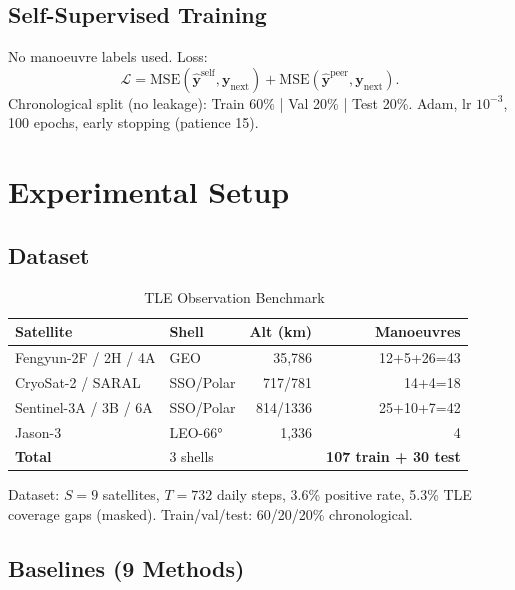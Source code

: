 \documentclass[journal]{IEEEtran}
\begin{document}
\subsection{Self-Supervised Training}
No manoeuvre labels used. Loss:
\begin{equation}
  \mathcal{L} = \text{MSE}(\hat{\mathbf{y}}^\text{self},\mathbf{y}_\text{next})
              + \text{MSE}(\hat{\mathbf{y}}^\text{peer},\mathbf{y}_\text{next}).
\end{equation}
Chronological split (no leakage): Train 60\% | Val 20\% | Test 20\%.
Adam, lr $10^{-3}$, 100 epochs, early stopping (patience 15).

\section{Experimental Setup}

\subsection{Dataset}

\begin{table}[h]
\centering\caption{TLE Observation Benchmark~\cite{shorten2023}}
\label{tab:dataset}
\setlength\tabcolsep{4pt}
\begin{tabular}{@{}llrr@{}}
\toprule
Satellite & Shell & Alt (km) & Manoeuvres \\
\midrule
Fengyun-2F / 2H / 4A & GEO       & 35,786 & 12+5+26=43 \\
CryoSat-2 / SARAL    & SSO/Polar & 717/781 & 14+4=18    \\
Sentinel-3A / 3B / 6A& SSO/Polar & 814/1336 & 25+10+7=42\\
Jason-3              & LEO-66°   & 1,336  & 4           \\
\midrule
\textbf{Total} & 3 shells & & \textbf{107 train + 30 test} \\
\bottomrule
\end{tabular}
\end{table}

Dataset: $S=9$ satellites, $T=732$ daily steps, 3.6\% positive rate,
5.3\% TLE coverage gaps (masked). Train/val/test: 60/20/20\% chronological.

\subsection{Baselines (9 Methods)}
\end{document}
